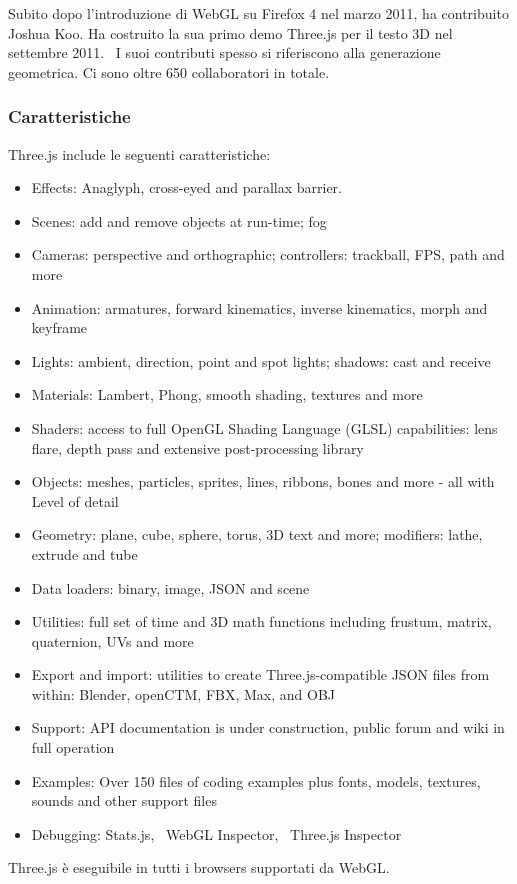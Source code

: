 Subito dopo l'introduzione di WebGL su Firefox 4 nel marzo 2011, ha contribuito Joshua Koo. Ha costruito la sua
primo demo Three.js per il testo 3D nel settembre 2011.~\cite{develop} I suoi contributi spesso si riferiscono alla generazione geometrica.
Ci sono oltre 650 collaboratori in totale.~\cite{develop}

\subsubsection{Caratteristiche}
Three.js include le seguenti caratteristiche:~\cite{mrdoob}
\begin{itemize}

\item Effects: Anaglyph, cross-eyed and parallax barrier.
\item Scenes: add and remove objects at run-time; fog
\item Cameras: perspective and orthographic; controllers: trackball, FPS, path and more
\item Animation: armatures, forward kinematics, inverse kinematics, morph and keyframe
\item Lights: ambient, direction, point and spot lights; shadows: cast and receive
\item Materials: Lambert, Phong, smooth shading, textures and more
\item Shaders: access to full OpenGL Shading Language (GLSL) capabilities: lens flare, depth pass and extensive post-processing library
\item Objects: meshes, particles, sprites, lines, ribbons, bones and more - all with Level of detail
\item Geometry: plane, cube, sphere, torus, 3D text and more; modifiers: lathe, extrude and tube
\item Data loaders: binary, image, JSON and scene
\item Utilities: full set of time and 3D math functions including frustum, matrix, quaternion, UVs and more
\item Export and import: utilities to create Three.js-compatible JSON files from within: Blender, openCTM, FBX, Max, and OBJ
\item Support: API documentation is under construction, public forum and wiki in full operation
\item Examples: Over 150 files of coding examples plus fonts, models, textures, sounds and other support files
\item Debugging: Stats.js,~\cite{stats.js} WebGL Inspector,~\cite{webglinspector} Three.js Inspector~\cite{threejsinspector}
\end{itemize}

Three.js è eseguibile in tutti i browsers supportati da WebGL.

